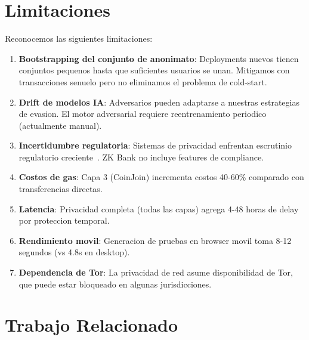 \documentclass[11pt]{article}
\theoremstyle{definition}
\theoremstyle{plain}
\theoremstyle{remark}
\begin{document}
\section{Limitaciones}
\label{sec:limitations}

Reconocemos las siguientes limitaciones:

\begin{enumerate}
    \item \textbf{Bootstrapping del conjunto de anonimato}: Deployments nuevos tienen conjuntos pequenos hasta que suficientes usuarios se unan. Mitigamos con transacciones senuelo pero no eliminamos el problema de cold-start.
    
    \item \textbf{Drift de modelos IA}: Adversarios pueden adaptarse a nuestras estrategias de evasion. El motor adversarial requiere reentrenamiento periodico (actualmente manual).
    
    \item \textbf{Incertidumbre regulatoria}: Sistemas de privacidad enfrentan escrutinio regulatorio creciente~\cite{ofac2022tornado}. ZK Bank no incluye features de compliance.
    
    \item \textbf{Costos de gas}: Capa 3 (CoinJoin) incrementa costos 40-60\% comparado con transferencias directas.
    
    \item \textbf{Latencia}: Privacidad completa (todas las capas) agrega 4-48 horas de delay por proteccion temporal.
    
    \item \textbf{Rendimiento movil}: Generacion de pruebas en browser movil toma 8-12 segundos (vs 4.8s en desktop).
    
    \item \textbf{Dependencia de Tor}: La privacidad de red asume disponibilidad de Tor, que puede estar bloqueado en algunas jurisdicciones.
\end{enumerate}

\section{Trabajo Relacionado}
\label{sec:related}
\end{document}
